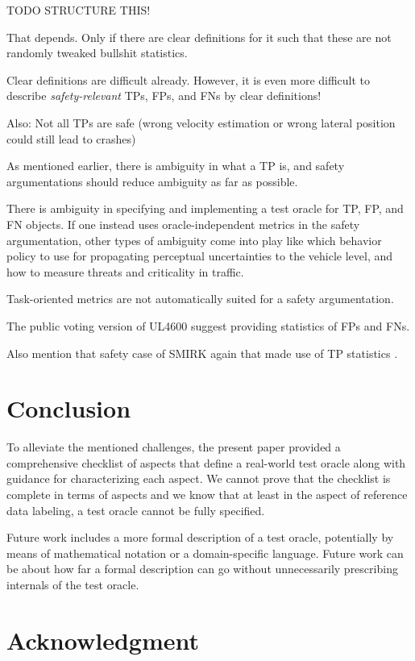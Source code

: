 \documentclass[conference]{IEEEtran}
\begin{document}
TODO STRUCTURE THIS!

That depends. Only if there are clear definitions for it such that these are not randomly tweaked bullshit statistics.

Clear definitions are difficult already.
However, it is even more difficult to describe \textit{safety-relevant} TPs, FPs, and FNs by clear definitions!

Also: Not all TPs are safe (wrong velocity estimation or wrong lateral position could still lead to crashes)

As mentioned earlier, there is ambiguity in what a TP is, and safety argumentations should reduce ambiguity as far as possible.


There is ambiguity in specifying and implementing a test oracle for TP, FP, and FN objects. 
If one instead uses oracle-independent metrics in the safety argumentation, other types of ambiguity come into play like which behavior policy to use for propagating perceptual uncertainties to the vehicle level, and how to measure threats and criticality in traffic. 

Task-oriented metrics are not automatically suited for a safety argumentation.

The public voting version of UL4600 \cite[Sec. 8.4.1.2]{UL4600_voting_2019} suggest providing statistics of FPs and FNs. 

Also mention that safety case of SMIRK again that made use of TP statistics \cite{Borg2022smirk}.

\section{Conclusion}
\label{sec:conclusion}

To alleviate the mentioned challenges, the present paper provided a comprehensive checklist of aspects that define a real-world test oracle along with guidance for characterizing each aspect.
We cannot prove that the checklist is complete in terms of aspects and we know that at least in the aspect of reference data labeling, a test oracle cannot be fully specified. 

Future work includes a more formal description of a test oracle, potentially by means of mathematical notation or a domain-specific language.
Future work can be about how far a formal description can go without unnecessarily prescribing internals of the test oracle. 


\section*{Acknowledgment}
\label{sec:acknowledgment}
\end{document}
